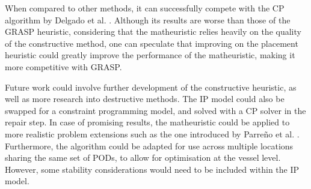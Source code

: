\documentclass[preprint,12pt,3p]{elsarticle}
\begin{document}
When compared to other methods, it can successfully compete with the CP algorithm by Delgado et al. \cite{DJJRA12}. Although its results are worse than those of the GRASP heuristic, considering that the matheuristic relies heavily on the quality of the constructive method, one can speculate that improving on the placement heuristic could greatly improve the performance of the matheuristic, making it more competitive with GRASP.

Future work could involve further development of the constructive heuristic, as well as more research into destructive methods. The IP model could also be swapped for a constraint programming model, and solved with a CP solver in the repair step. In case of promising results, the matheuristic could be applied to more realistic problem extensions such as the one introduced by Parre\~{n}o et al. \cite{PPAV16}. Furthermore, the algorithm could be adapted for use across multiple locations sharing the same set of PODs, to allow for optimisation at the vessel level. However, some stability considerations would need to be included within the IP model.









% 
% 
% 
% 
% 
% 
% 
% 
% 
% 
% 
% 


\end{document}
